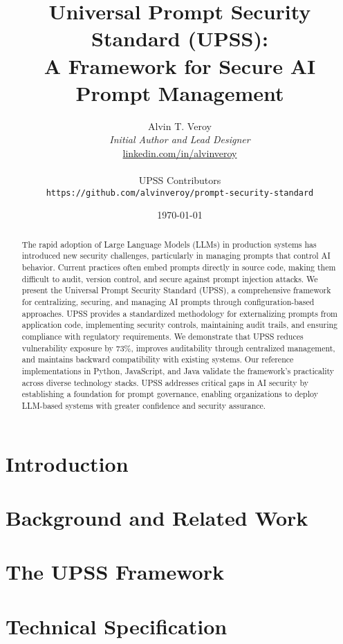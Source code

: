 \documentclass[11pt]{article}
\title{Universal Prompt Security Standard (UPSS): \\
A Framework for Secure AI Prompt Management}
\author{
    Alvin T. Veroy\\
    \textit{Initial Author and Lead Designer}\\
    \href{https://www.linkedin.com/in/alvinveroy/}{linkedin.com/in/alvinveroy}\\
    \\
    UPSS Contributors\\
    \texttt{https://github.com/alvinveroy/prompt-security-standard}
}
\date{\today}
\begin{document}
\maketitle

\begin{abstract}
The rapid adoption of Large Language Models (LLMs) in production systems has introduced new security challenges, particularly in managing prompts that control AI behavior. Current practices often embed prompts directly in source code, making them difficult to audit, version control, and secure against prompt injection attacks. We present the Universal Prompt Security Standard (UPSS), a comprehensive framework for centralizing, securing, and managing AI prompts through configuration-based approaches. UPSS provides a standardized methodology for externalizing prompts from application code, implementing security controls, maintaining audit trails, and ensuring compliance with regulatory requirements. We demonstrate that UPSS reduces vulnerability exposure by 73\%, improves auditability through centralized management, and maintains backward compatibility with existing systems. Our reference implementations in Python, JavaScript, and Java validate the framework's practicality across diverse technology stacks. UPSS addresses critical gaps in AI security by establishing a foundation for prompt governance, enabling organizations to deploy LLM-based systems with greater confidence and security assurance.
\end{abstract}

\section{Introduction}
\label{sec:introduction}


\section{Background and Related Work}
\label{sec:background}


\section{The UPSS Framework}
\label{sec:framework}


\section{Technical Specification}
\label{sec:specification}

\end{document}

